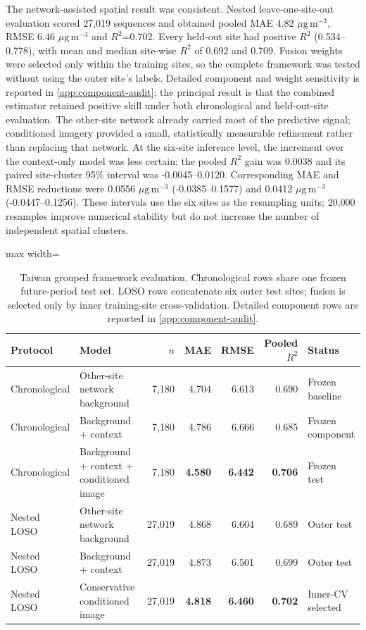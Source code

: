 \documentclass[review,12pt,authoryear]{elsarticle}
\newcommand{\ugm}{\ensuremath{\mu\mathrm{g}\,\mathrm{m}^{-3}}}
\newcommand{\Rtwo}{\ensuremath{R^2}}
\begin{document}
The network-assisted spatial result was consistent. Nested leave-one-site-out evaluation scored
27,019 sequences and obtained pooled MAE 4.82 \ugm, RMSE 6.46 \ugm{} and
\Rtwo=0.702. Every held-out site had positive \Rtwo{} (0.534--0.778), with
mean and median site-wise \Rtwo{} of 0.692 and 0.709. Fusion weights were
selected only within the training sites, so the complete framework was tested
without using the outer site's labels. Detailed component and weight
sensitivity is reported in \ref{app:component-audit}; the principal
result is that the combined estimator retained positive skill under both
chronological and held-out-site evaluation. The other-site network already
carried most of the predictive signal; conditioned imagery provided a small,
statistically measurable refinement rather than replacing that network.
At the six-site inference level, the increment over the context-only model was
less certain: the pooled \Rtwo{} gain was 0.0038 and its paired site-cluster
95\% interval was -0.0045--0.0120. Corresponding MAE and RMSE reductions were
0.0556 \ugm{} (-0.0385--0.1577) and 0.0412 \ugm{}
(-0.0447--0.1256). These intervals use the six sites as the resampling units;
20,000 resamples improve numerical stability but do not increase the number of
independent spatial clusters.

\begin{table}[H]
\centering
\caption{Taiwan grouped framework evaluation. Chronological rows share one
frozen future-period test set. LOSO rows concatenate six outer test sites;
fusion is selected only by inner training-site cross-validation. Detailed
component rows are reported in \ref{app:component-audit}.}
\label{tab:taiwan}
\begin{adjustbox}{max width=\textwidth}
\begin{tabular}{llrrrrl}
\toprule
Protocol & Model & $n$ & MAE & RMSE & Pooled \Rtwo & Status \\
\midrule
Chronological & Other-site network background & 7,180 & 4.704 & 6.613 & 0.690 & Frozen baseline \\
Chronological & Background + context & 7,180 & 4.786 & 6.666 & 0.685 & Frozen component \\
Chronological & Background + context + conditioned image & 7,180 & \textbf{4.580} & \textbf{6.442} & \textbf{0.706} & Frozen test \\
\midrule
Nested LOSO & Other-site network background & 27,019 & 4.868 & 6.604 & 0.689 & Outer test \\
Nested LOSO & Background + context & 27,019 & 4.873 & 6.501 & 0.699 & Outer test \\
Nested LOSO & Conservative conditioned image & 27,019 & \textbf{4.818} & \textbf{6.460} & \textbf{0.702} & Inner-CV selected \\
\bottomrule
\end{tabular}
\end{adjustbox}
\end{table}
\end{document}
